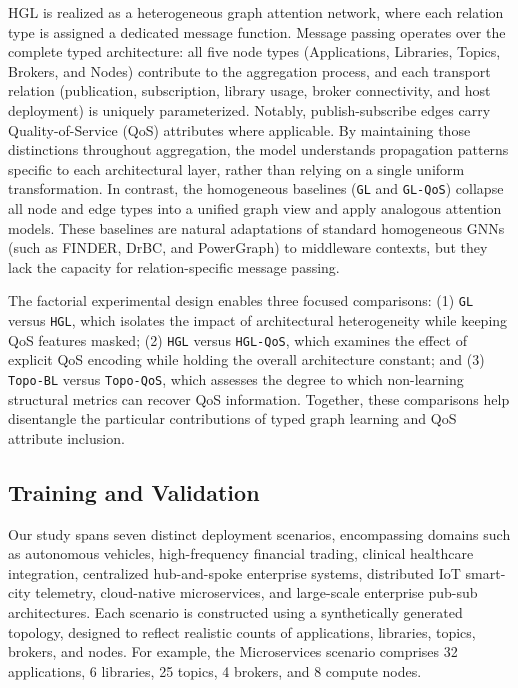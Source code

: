 \documentclass[review]{elsarticle}
\begin{document}
HGL is realized as a heterogeneous graph attention network, where each relation type is assigned a
dedicated message function. Message passing operates over the complete typed architecture: all
five node types (Applications, Libraries, Topics, Brokers, and Nodes) contribute to the aggregation
process, and each transport relation (publication, subscription, library usage, broker
connectivity, and host deployment) is uniquely parameterized. Notably, publish-subscribe edges
carry Quality-of-Service (QoS) attributes where applicable. By maintaining those distinctions
throughout aggregation, the model understands propagation patterns specific to each architectural
layer, rather than relying on a single uniform transformation. In contrast, the homogeneous
baselines (\texttt{GL} and \texttt{GL-QoS}) collapse all node and edge types into a unified graph
view and apply analogous attention models. These baselines are natural adaptations of standard
homogeneous GNNs (such as FINDER, DrBC, and PowerGraph) to middleware contexts, but they lack the
capacity for relation-specific message passing.

The factorial experimental design enables three focused comparisons: (1) \texttt{GL} versus
\texttt{HGL}, which isolates the impact of architectural heterogeneity while keeping QoS features
masked; (2) \texttt{HGL} versus \texttt{HGL-QoS}, which examines the effect of explicit QoS
encoding while holding the overall architecture constant; and (3) \texttt{Topo-BL} versus
\texttt{Topo-QoS}, which assesses the degree to which non-learning structural metrics can recover
QoS information. Together, these comparisons help disentangle the particular contributions of typed
graph learning and QoS attribute inclusion.

\subsection{Training and Validation}

Our study spans seven distinct deployment scenarios, encompassing domains such as autonomous
vehicles, high-frequency financial trading, clinical healthcare integration, centralized
hub-and-spoke enterprise systems, distributed IoT smart-city telemetry, cloud-native
microservices, and large-scale enterprise pub-sub architectures. Each scenario is constructed
using a synthetically generated topology, designed to reflect realistic counts of applications,
libraries, topics, brokers, and nodes. For example, the Microservices scenario comprises 32
applications, 6 libraries, 25 topics, 4 brokers, and 8 compute nodes.
\end{document}
